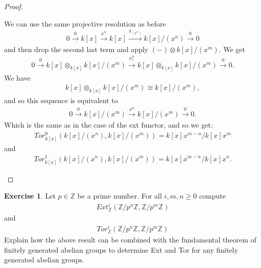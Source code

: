 \documentclass[12pt]{extarticle}
\newcommand{\Z}{\mathbb{Z}}
\newcommand{\<}{\langle}
\renewcommand{\>}{\rangle}
\theoremstyle{definition}
\newtheorem{exercise}{Exercise}
\begin{document}
\begin{proof}
\begin{itemize}
    We can use the same projective resolution as before
    \begin{align*}
      0 \xrightarrow{0} k[x] \xrightarrow{x^n} k[x] \xrightarrow{\pi_{(x^n)}} k[x]/(x^n) \xrightarrow{0} 0  
    \end{align*}
    and then drop the second last term and apply $(-) \otimes k[x]/(x^m)$.
    We get
    \begin{align*}
      0 \xrightarrow{0} k[x] \otimes_{k[x]} k[x]/(x^m)  \xrightarrow{x^n_*} k[x] \otimes_{k[x]} k[x]/(x^m) \xrightarrow{0} 0  .
    \end{align*}
    We have
    \begin{align*}
      k[x] \otimes_{k[x]} k[x]/(x^m) \cong k[x]/(x^m),
    \end{align*}
    and so this sequence is equivalent to
    \begin{align*}
      0 \xrightarrow{0} k[x]/(x^m)  \xrightarrow{x^n} k[x]/(x^m) \xrightarrow{0} 0  .      
    \end{align*}
    Which is the same as in the case of the ext functor, and so we get:
    \begin{align*}
      Tor_{k[x]}^0(k[x]/(x^n), k[x]/(x^m)) = k[x]x^{m-n}/k[x]x^m 
    \end{align*}
    and
    \begin{align*}
      Tor_{k[x]}^1(k[x]/(x^n), k[x]/(x^m)) = k[x]x^{m-n}/k[x]x^n .
    \end{align*}
  \end{itemize}
\end{proof}
\begin{exercise}
  Let $p \in \Z$ be a prime number. For all $i,m,n \geq 0 $ compute
  \begin{align*}
    Ext_{\Z}^i(\Z/p^n\Z, \Z/p^m\Z)
  \end{align*}
  and
  \begin{align*}
    Tor_{\Z}^i(\Z/p^n\Z, \Z/p^m\Z)
  \end{align*}
  Explain how the above result can be combined with the fundamental theorem of finitely generated abelian groups to determine Ext and Tor for any finitely generated abelian groups.
\end{exercise}
\end{document}
